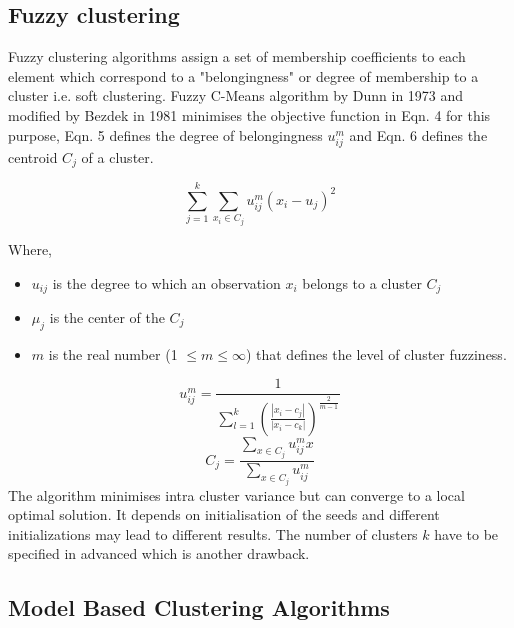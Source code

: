 \subsection{Fuzzy clustering}

Fuzzy clustering algorithms assign a set of membership coefficients to each element which correspond to a "belongingness" or degree of membership to a cluster i.e. soft clustering. Fuzzy C-Means algorithm by Dunn in 1973 \cite{aps:45} and modified by Bezdek in 1981 \cite{aps:45} minimises the objective function in Eqn. 4 for this purpose, Eqn. 5 defines the degree of belongingness $u_{ij}^m$ and Eqn. 6 defines the centroid $C_j$ of a cluster.  

\begin{equation}
\sum_{j=1}^{k}\sum_{x_i \in C_j} u_{ij}^m (x_i - u_j)^2 
\end{equation}

Where,
\begin{itemize}
\item $u_{ij}$ is the degree to which an observation $x_i$ belongs to a cluster $C_j$
\item $μ_j$ is the center of the $C_j$
\item $m$ is the real number (1 $\leq m \leq \infty$) that defines the level of cluster fuzziness.

\end{itemize}

\begin{equation}
u_{ij}^m = \frac{1}{\sum_{l=1}^{k} (\frac{|x_i - c_j|}{|x_i - c_k|})^\frac{2}{m-1}}   
\end{equation}
\begin{equation}
C_j = \frac{ \sum_{x \in C_j} u_{ij}^m x}{\sum_{x \in C_j} u_{ij}^m}
\end{equation}
‏
The algorithm minimises intra cluster variance but can converge to a  local optimal solution. It depends on initialisation of the seeds and different initializations may lead to different results. The number of clusters $k$ have to be specified in advanced which is another drawback.

\subsection{Model Based Clustering Algorithms}

